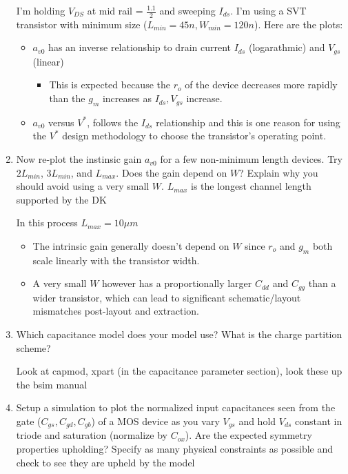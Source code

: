 \begin{enumerate}
    I'm holding $V_{DS}$ at mid rail = $\frac{1.1}{2}$ and sweeping $I_{ds}$. I'm using a SVT transistor with minimum size ($L_{min} = 45n, W_{min} = 120n$). Here are the plots:


    \begin{itemize}
        \item $a_{v0}$ has an inverse relationship to drain current $I_{ds}$ (logarathmic) and $V_{gs}$ (linear)
        \begin{itemize}
            \item This is expected because the $r_o$ of the device decreases more rapidly than the $g_m$ increases as $I_{ds}, V_{gs}$ increase.
        \end{itemize}
        \item $a_{v0}$ versus $V^*$, follows the $I_{ds}$ relationship and this is one reason for using the $V^*$ design methodology to choose the transistor's operating point.
    \end{itemize}

\item {\color{blue}Now re-plot the instinsic gain $a_{v0}$ for a few non-minimum length devices. Try $2 L_{min}$, $3 L_{min}$, and $L_{max}$. Does the gain depend on $W$? Explain why you should avoid using a very small $W$. $L_{max}$ is the longest channel length supported by the DK}

    In this process $L_{max} = 10 \mu m$
    \begin{itemize}
        \item The intrinsic gain generally doesn't depend on $W$ since $r_o$ and $g_m$ both scale linearly with the transistor width.
        \item A very small $W$ however has a proportionally larger $C_{dd}$ and $C_{gg}$ than a wider transistor, which can lead to significant schematic/layout mismatches post-layout and extraction.
    \end{itemize}

\item {\color{blue}Which capacitance model does your model use? What is the charge partition scheme?}

    Look at capmod, xpart (in the capacitance parameter section), look these up the bsim manual

\item {\color{blue}Setup a simulation to plot the normalized input capacitances seen from the gate ($C_{gs}, C_{gd}, C_{gb}$) of a MOS device as you vary $V_{gs}$ and hold $V_{ds}$ constant in triode and saturation (normalize by $C_{ox}$). Are the expected symmetry properties upholding? Specify as many physical constraints as possible and check to see they are upheld by the model}


\end{enumerate}
